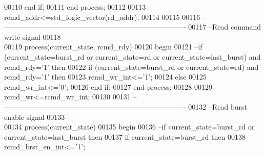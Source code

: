 \begin{DoxyCode}
00110         \textcolor{keywordflow}{end} \textcolor{keywordflow}{if};
00111 \textcolor{keywordflow}{end} \textcolor{keywordflow}{process};
00112 
00113 \textcolor{vhdlchar}{rcmd_addr}\textcolor{vhdlchar}{<=}\textcolor{comment}{std\_logic\_vector}\textcolor{vhdlchar}{(}\textcolor{vhdlchar}{rd_addr}\textcolor{vhdlchar}{)};
00114 
00115 
00116 \textcolor{keyword}{-- ----------------------------------------------------------------------------}
00117 \textcolor{keyword}{--Read command write signal}
00118 \textcolor{keyword}{-- ----------------------------------------------------------------------------}
00119 \textcolor{keywordflow}{process}(current_state, rcmd_rdy)
00120 \textcolor{vhdlkeyword}{begin}
00121 \textcolor{keyword}{    --if (current\_state=burst\_rd or current\_state=rd or current\_state=last\_burst) and rcmd\_rdy='1' then }
00122     \textcolor{keywordflow}{if} \textcolor{vhdlchar}{(}\textcolor{vhdlchar}{current_state}\textcolor{vhdlchar}{=}\textcolor{vhdlchar}{burst\_rd} \textcolor{keywordflow}{or} \textcolor{vhdlchar}{current_state}\textcolor{vhdlchar}{=}\textcolor{vhdlchar}{rd}\textcolor{vhdlchar}{)} \textcolor{keywordflow}{and} \textcolor{vhdlchar}{rcmd_rdy}\textcolor{vhdlchar}{=}\textcolor{vhdlchar}{'}\textcolor{vhdllogic}{}\textcolor{vhdllogic}{1}\textcolor{vhdlchar}{'} \textcolor{keywordflow}{then} 
00123         \textcolor{vhdlchar}{rcmd_wr_int}\textcolor{vhdlchar}{<=}\textcolor{vhdlchar}{'}\textcolor{vhdllogic}{}\textcolor{vhdllogic}{1}\textcolor{vhdlchar}{'};
00124     \textcolor{keywordflow}{else} 
00125         \textcolor{vhdlchar}{rcmd_wr_int}\textcolor{vhdlchar}{<=}\textcolor{vhdlchar}{'}\textcolor{vhdllogic}{}\textcolor{vhdllogic}{0}\textcolor{vhdlchar}{'};
00126     \textcolor{keywordflow}{end} \textcolor{keywordflow}{if};
00127 \textcolor{keywordflow}{end} \textcolor{keywordflow}{process};
00128 
00129 \textcolor{vhdlchar}{rcmd_wr}\textcolor{vhdlchar}{<=}\textcolor{vhdlchar}{rcmd_wr_int};
00130 
00131 \textcolor{keyword}{-- ----------------------------------------------------------------------------}
00132 \textcolor{keyword}{--Read burst enable signal}
00133 \textcolor{keyword}{-- ----------------------------------------------------------------------------}
00134 \textcolor{keywordflow}{process}(current_state)
00135 \textcolor{vhdlkeyword}{begin}
00136 \textcolor{keyword}{    --if current\_state=burst\_rd  or current\_state=last\_burst then }
00137     \textcolor{keywordflow}{if} \textcolor{vhdlchar}{current_state}\textcolor{vhdlchar}{=}\textcolor{vhdlchar}{burst\_rd}  \textcolor{keywordflow}{then} 
00138         \textcolor{vhdlchar}{rcmd_brst_en_int}\textcolor{vhdlchar}{<=}\textcolor{vhdlchar}{'}\textcolor{vhdllogic}{}\textcolor{vhdllogic}{1}\textcolor{vhdlchar}{'};

\end{DoxyCode}
